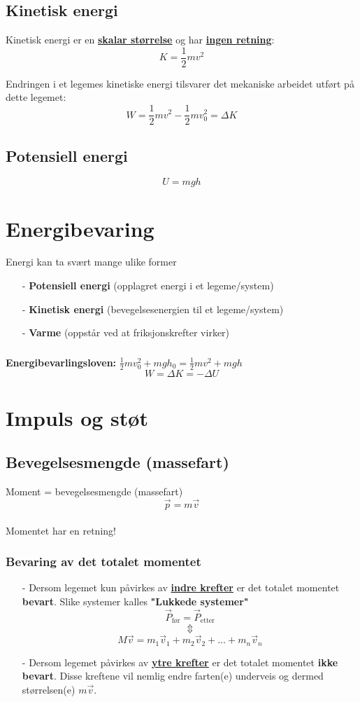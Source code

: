 \documentclass[12pt]{article}
\begin{document}
\subsection{Kinetisk energi}
Kinetisk energi er en \underline{\textbf{skalar størrelse}} og har \underline{\textbf{ingen retning}}:
$$K = \frac{1}{2}mv^2$$

Endringen i et legemes kinetiske energi tilsvarer det mekaniske arbeidet utført på dette legemet:
$$W = \frac{1}{2}mv^2 - \frac{1}{2}mv_0^2 = \Delta K$$
\subsection{Potensiell energi}
$$U = mgh$$

\section{Energibevaring}
Energi kan ta svært mange ulike former
\begin{itemize}
    \item[-] \textbf{Potensiell energi} (opplagret energi i et legeme/system)
    \item[-] \textbf{Kinetisk energi} (bevegelsesenergien til et legeme/system)
    \item[-] \textbf{Varme} (oppstår ved at friksjonskrefter virker)
\end{itemize}
\subsubsection{}
\textbf{Energibevarlingsloven: }$\frac{1}{2}mv_0^2+mgh_0 = \frac{1}{2}mv^2+mgh$
$$W = \Delta K = -\Delta U$$

\section{Impuls og støt}
\subsection{Bevegelsesmengde (massefart)}
Moment = bevegelsesmengde (massefart)\\
$$\Vec{p} = m\Vec{v}$$\\
Momentet har en retning!
\subsubsection{Bevaring av det totalet momentet}
\begin{itemize}
    \item[-] Dersom legemet kun påvirkes av \underline{\textbf{indre krefter}} er det totalet momentet \textbf{bevart}. Slike systemer kalles \textbf{"Lukkede systemer"}
    $$\Vec{P}_{\text{før}} = \Vec{P}_{\text{etter}} $$
    $$\Updownarrow$$
    $$M\Vec{v} = m_1\Vec{v}_1 + m_2\Vec{v}_2 + \dots + m_n\Vec{v}_n$$
    \item[-] Dersom legemet påvirkes av \underline{\textbf{ytre krefter}} er det totalet momentet \textbf{ikke bevart}. Disse kreftene vil nemlig  endre farten(e) underveis og dermed størrelsen(e) $m\Vec{v}$.
\end{itemize}
\end{document}
